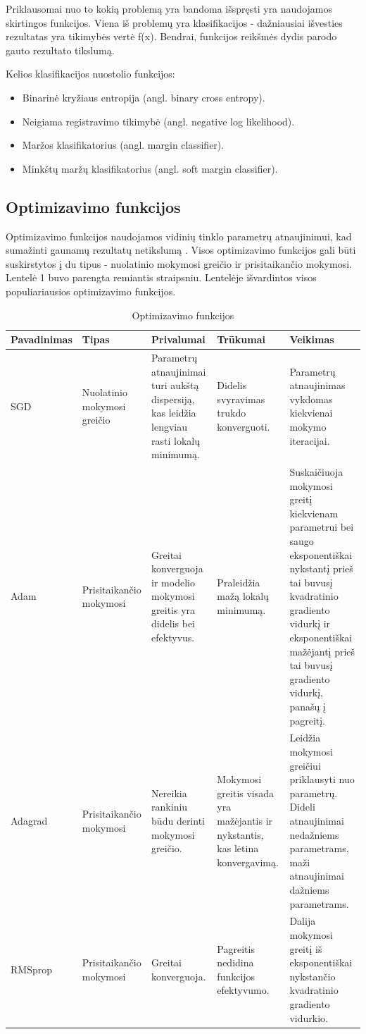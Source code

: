 \documentclass{VUMIFPSbakalaurinis}
\begin{document}
Priklausomai nuo to kokią problemą yra bandoma išspręsti yra naudojamos skirtingos funkcijos. Viena iš problemų yra klasifikacijos - dažniausiai išvesties
rezultatas yra tikimybės vertė f(x). Bendrai, funkcijos reikšmės dydis parodo gauto rezultato tikslumą.

Kelios klasifikacijos nuostolio funkcijos:
\begin{itemize}
\item Binarinė kryžiaus entropija (angl. binary cross entropy).
\item Neigiama registravimo tikimybė (angl. negative log likelihood).
\item Maržos klasifikatorius (angl. margin classifier).
\item Minkštų maržų klasifikatorius (angl. soft margin classifier).
\end{itemize}

\subsection{Optimizavimo funkcijos}
Optimizavimo funkcijos naudojamos vidinių tinklo parametrų atnaujinimui, kad sumažinti gaunamų rezultatų netikslumą \cite{Niknafs2016NeuralNO}. 
Visos optimizavimo funkcijos gali būti suskirstytos į du tipus - nuolatinio mokymosi greičio ir prisitaikančio mokymosi. 
Lentelė 1 buvo parengta remiantis \cite{DBLP:journals/corr/Ruder16} straipsniu. Lentelėje išvardintos visos populiariausios optimizavimo funkcijos.

\begin{longtable}[h!]{ | p{2cm} | p{2.2cm} | p{2.5cm} | p{2.5cm} | p{4.5cm} | } 
\caption{Optimizavimo funkcijos} \\ \hline
Pavadinimas & Tipas & Privalumai & Trūkumai & Veikimas \\ \hline
\endhead
SGD & Nuolatinio mokymosi greičio & Parametrų atnaujinimai turi aukštą dispersiją, kas leidžia lengviau rasti lokalų minimumą. & Didelis svyravimas trukdo konverguoti. & Parametrų atnaujinimas vykdomas kiekvienai mokymo iteracijai. \\ \hline
Adam & Prisitaikančio mokymosi & Greitai konverguoja ir modelio mokymosi greitis yra didelis bei efektyvus. & Praleidžia mažą lokalų minimumą. & Suskaičiuoja mokymosi greitį kiekvienam parametrui bei saugo eksponentiškai nykstantį prieš tai buvusį kvadratinio gradiento vidurkį ir eksponentiškai mažėjantį prieš tai buvusį gradiento vidurkį, panašų į pagreitį. \\ \hline
Adagrad & Prisitaikančio mokymosi & Nereikia rankiniu būdu derinti mokymosi greičio. & Mokymosi greitis visada yra mažėjantis ir nykstantis, kas lėtina konvergavimą. & Leidžia mokymosi greičiui priklausyti nuo parametrų. Dideli atnaujinimai nedažniems parametrams, maži atnaujinimai dažniems parametrams. \\ \hline
RMSprop & Prisitaikančio mokymosi & Greitai konverguoja. & Pagreitis nedidina funkcijos efektyvumo. & Dalija mokymosi greitį iš eksponentiškai nykstančio kvadratinio gradiento vidurkio. \\ \hline
\end{longtable}
\end{document}
